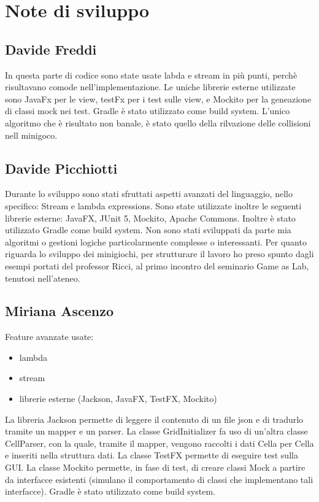 \documentclass[a4paper,12pt]{report}
\begin{document}
	\section{Note di sviluppo}

	\subsection{Davide Freddi}

	In questa parte di codice sono state usate labda e stream in più punti, perchè risultavano comode nell'implementazione.
    Le uniche librerie esterne utilizzate sono JavaFx per le view, testFx per i test sulle view, e Mockito per la geneazione di classi mock nei test.
    Gradle è stato utilizzato come build system.
    L'unico algoritmo che è risultato non banale, è stato quello della rilvazione delle collisioni nell minigoco.

	\subsection{Davide Picchiotti}

    Durante lo sviluppo sono stati sfruttati aspetti avanzati del linguaggio, nello specifico: Stream e lambda expressions.\newline
    Sono state utilizzate inoltre le seguenti librerie esterne: JavaFX, JUnit 5, Mockito, Apache Commons.\newline
    Inoltre è stato utilizzato Gradle come build system.\newline
    Non sono stati sviluppati da parte mia algoritmi o gestioni logiche particolarmente complesse o interessanti.\newline
    Per quanto riguarda lo sviluppo dei minigiochi, per strutturare il lavoro ho preso spunto dagli esempi portati del professor Ricci,
    al primo incontro del seminario Game as Lab, tenutosi nell'ateneo.\newline

	\subsection{Miriana Ascenzo}

	Feature avanzate usate:
	\begin{itemize}
		\item lambda
		\item stream
		\item librerie esterne (Jackson, JavaFX, TestFX, Mockito)
	\end {itemize}
	La libreria Jackson permette di leggere il contenuto di un file json e di tradurlo tramite un mapper e un parser.
	La classe GridInitializer fa uso di un’altra classe CellParser, con la quale, tramite il mapper, vengono raccolti i dati Cella per Cella e inseriti nella struttura dati.
	La classe TestFX permette di eseguire test sulla GUI.
	La classe Mockito permette, in fase di test, di creare classi Mock a partire da interfacce esistenti (simulano il comportamento di classi che implementano tali interfacce).
    Gradle è stato utilizzato come build system.
\end{document}
